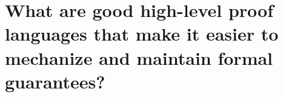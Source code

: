 \documentclass{beamer}
\newcommand{\emphFact}[1]{{\emph{#1}}}
\begin{document}
\section{What are good high-level proof languages that make it easier to mechanize and maintain formal guarantees?}






\end{document}
